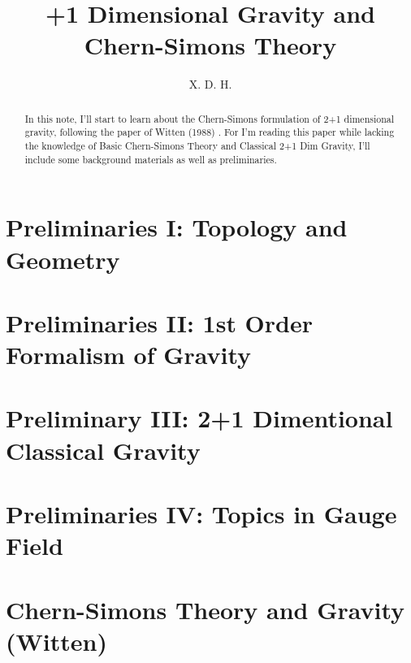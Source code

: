 \documentclass[11pt]{article}
\begin{document}
\title{+1 Dimensional Gravity and Chern-Simons Theory}
\author{X. D. H.}

\maketitle

\begin{abstract}
  In this note, I'll start to learn about the Chern-Simons
  formulation of 2+1 dimensional gravity, following the paper of
  Witten (1988)\cite{witten21Dimensional1988}  . For I'm reading this
  paper while lacking the knowledge of Basic Chern-Simons Theory and
  Classical 2+1 Dim Gravity, I'll include some background materials
  as well as preliminaries.
\end{abstract}

\tableofcontents

\section{Preliminaries I: Topology and Geometry}


\newpage
\section{Preliminaries II: 1st Order Formalism of
Gravity}\label{sec:Preliminaries II: 2+1 Dimensinal Gravity
Fundamentals} %


\newpage
\section{Preliminary III: 2+1 Dimentional Classical
Gravity}\label{sec:} %


\newpage
\section{Preliminaries IV: Topics in Gauge
Field}\label{sec:Preliminaries III: Topics in Gauge Field} %


\newpage
\section{Chern-Simons Theory and Gravity
(Witten)}\label{sec:Chern-Simons Theory and Gravity (Witten)} %

\end{document}
